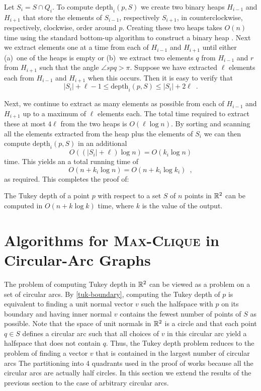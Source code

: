 \documentclass[charterfonts,lotsofwhite]{patmorin}
\newcommand{\td}{\mathrm{depth}}
\begin{document}
Let $S_i=S\cap Q_i$. To compute $\td_i(p,S)$ we create two binary
heaps $H_{i-1}$ and $H_{i+1}$ that store the elements of $S_{i-1}$,
respectively $S_{i+1}$, in counterclockwise, respectively, clockwise,
order around $p$. Creating these two heaps takes $O(n)$ time using the
standard bottom-up algorithm to construct a binary heap \cite{clrXX}.
Next we extract elements one at a time from each of $H_{i-1}$ and
$H_{i+1}$ until either (a)~one of the heaps is empty or (b)~we extract
two elements $q$ from $H_{i-1}$ and $r$ from $H_{i+1}$ such that the
angle $\angle spq > \pi$.  Suppose we have extracted $\ell$ elements
each from $H_{i-1}$ and $H_{i+1}$ when this occurs.  Then it is easy
to verify that 
\[  
  |S_i| + \ell - 1 \le \td_i(p,S) \le |S_i| + 2\ell \enspace .
\]

Next, we continue to extract as many elements as possible from each of
$H_{i-1}$ and $H_{i+1}$ up to a maximum of $\ell$ elements each. The
total time required to extract these at most $4\ell$ from the two
heaps is $O(\ell\log n)$.  By sorting and scanning all the elements
extracted from the heap plus the elements of $S_i$ we can then
compute $\td_i(p,S)$ in an additional
\[
     O((|S_i|+\ell)\log n) = O(k_i\log n)
\] 
time.  This yields an a total running time of 
\[  
   O(n + k_i\log n) = O(n + k_i\log k_i) \enspace ,
\]
as required.  This completes the proof of:

\begin{thm}
The Tukey depth of a point $p$ with respect to a set $S$ of $n$ points
in $\mathbb{R}^2$ can be computed in $O(n + k\log k)$ time, where
$k$ is the value of the output.
\end{thm}

\section{Algorithms for \textsc{Max-Clique} in Circular-Arc Graphs}

The problem of computing Tukey depth in $\mathbb{R}^2$ can be viewed as a
problem on a set of circular arcs.  By \eqref{tuk-boundary}, computing
the Tukey depth of $p$ is equivalent to finding a unit normal vector
$v$ such the halfspace with $p$ on its boundary and having inner
normal $v$ contains the fewest number of points of $S$ as possible.
Note that the space of unit normals in $\mathbb{R}^2$ is a circle and that
each point $q\in S$ defines a circular arc such that all choices of
$v$ in this circular arc yield a halfspace that does not contain $q$.
Thus, the Tukey depth problem reduces to the problem of finding a
vector $v$ that is contained in the largest number of circular arcs
The partitioning into 4 quadrants used in the proof of 
works because all the circular arcs are actually half circles.  In
this section we extend the results of the previous section to the case
of arbitrary circular arcs.
\end{document}
